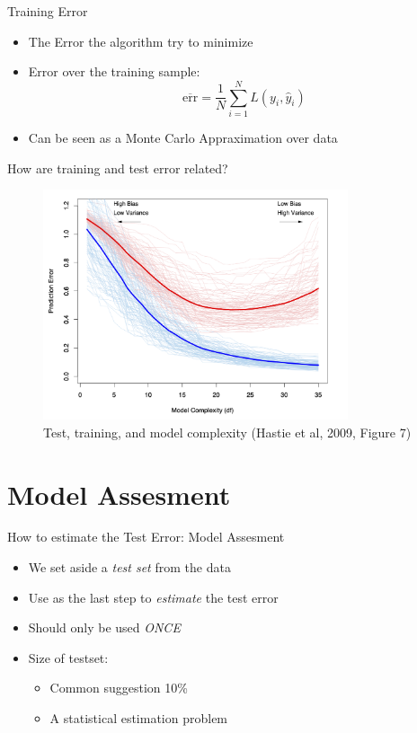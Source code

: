 \documentclass[10pt,handout]{beamer}
\begin{document}
\begin{frame}{Training Error}

\begin{itemize}
\item The Error the algorithm try to minimize
\item Error over the training sample:
\[
\overline{\text{err}} = \frac{1}{N} \sum_{i=1}^N L(y_i,\hat{y}_i)
\]
\item Can be seen as a Monte Carlo Appraximation over data

\end{itemize}

\end{frame}


\begin{frame}{How are training and test error related?}


\begin{figure}[h]
\caption{Test, training, and model complexity (Hastie et al, 2009, Figure 7)}
\centering
\includegraphics[width=0.8\textwidth]{figs/ESL_7_1.png}
\end{figure}

\end{frame}


\section{Model Assesment}

\begin{frame}{How to estimate the Test Error: Model Assesment}

\begin{itemize}
\item We set aside a \emph{test set} from the data
\item Use as the last step to \emph{estimate} the test error
\item Should only be used \emph{ONCE}\pause
\item Size of testset:
\begin{itemize}
\item Common suggestion 10\%
\item A statistical estimation problem
\end{itemize}
\end{itemize}

\end{frame}
\end{document}
